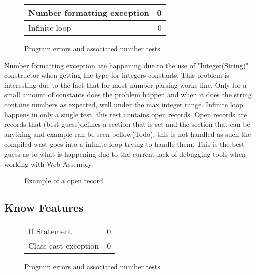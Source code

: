\begin{figure}[H]
  \centering
  \begin{tabular}{| l || r |}
  \hline
  Number formatting exception & 0 \\ \hline
  Infinite loop & 0\\ \hline
  \hline
  \end{tabular}
  \caption{Program errors and associated number tests}
  \label{fig:table2}
\end{figure}

Number formatting exception are happening due to the use of "Integer(String)" constructor when getting the type for integers constants. This problem is interesting due to the fact that for most number parsing works fine. Only for a small amount of constants does the problem happen and when it does the string contains numbers as expected, well under the max integer range. %
Infinite loop happens in only a single test, this test contains open records. Open records are records that (best guess)defines a section that is set and the section that can be anything and example can be seen bellow(Todo), this is not handled as such the compiled wast goes into a infinite loop trying to handle them. This is the best guess as to what is happening due to the current lack of debugging tools when working with Web Assembly.

\begin{figure}[H]
  \centering
  \caption{Example of a open record}
  \label{fig:table2}
\end{figure}

\subsection{Know Features}

\begin{figure}[H]
  \centering
  \begin{tabular}{| l || r |}
  \hline
  If Statement & 0 \\
  Class cast exception & 0 \\ \hline 
  \hline
  \end{tabular}
  \caption{Program errors and associated number tests}
  \label{fig:table2}
\end{figure}

